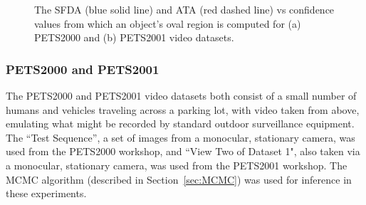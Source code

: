 \documentclass[twocolumn, final]{svjour3}
\begin{document}
\begin{figure}[!]
  \centering             
   \hspace{1mm}
  \caption{The SFDA (blue solid line) and ATA (red dashed line) vs  confidence values from which an object's oval region is computed for (a) PETS2000 and (b) PETS2001 video datasets.}
  \label{fig:pm_conf}
\end{figure}


\subsubsection{PETS2000 and PETS2001}
\label{sec:pets2000and2001}

The PETS2000 and PETS2001 video datasets both consist of a small number of humans and vehicles traveling across a parking lot, with video taken from above, emulating what might be recorded by standard outdoor surveillance equipment. The ``Test Sequence'', a set of images from a monocular, stationary camera, was used from the PETS2000 workshop, and ``View Two of Dataset 1", also taken via a monocular, stationary camera, was used from the PETS2001 workshop. The MCMC algorithm (described in Section~\ref{sec:MCMC}) was used for inference in these experiments.
\end{document}
